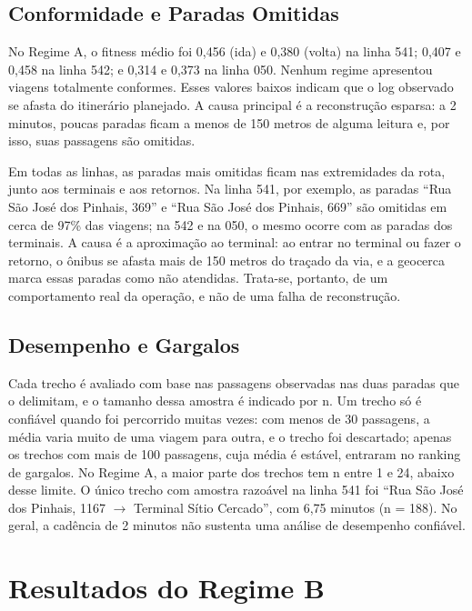 \subsection{Conformidade e Paradas Omitidas}\label{subsec:regimeA_conformidade}

No Regime A, o fitness médio foi 0,456 (ida) e 0,380 (volta) na linha 541; 0,407 e 0,458 na linha 542; e 0,314 e 0,373 na linha 050. Nenhum regime apresentou viagens totalmente conformes. Esses valores baixos indicam que o log observado se afasta do itinerário planejado. A causa principal é a reconstrução esparsa: a 2 minutos, poucas paradas ficam a menos de 150 metros de alguma leitura e, por isso, suas passagens são omitidas.

Em todas as linhas, as paradas mais omitidas ficam nas extremidades da rota, junto aos terminais e aos retornos. Na linha 541, por exemplo, as paradas ``Rua São José dos Pinhais, 369'' e ``Rua São José dos Pinhais, 669'' são omitidas em cerca de 97\% das viagens; na 542 e na 050, o mesmo ocorre com as paradas dos terminais. A causa é a aproximação ao terminal: ao entrar no terminal ou fazer o retorno, o ônibus se afasta mais de 150 metros do traçado da via, e a geocerca marca essas paradas como não atendidas. Trata-se, portanto, de um comportamento real da operação, e não de uma falha de reconstrução.

\subsection{Desempenho e Gargalos}\label{subsec:regimeA_desempenho}

Cada trecho é avaliado com base nas passagens observadas nas duas paradas que o delimitam, e o tamanho dessa amostra é indicado por n. Um trecho só é confiável quando foi percorrido muitas vezes: com menos de 30 passagens, a média varia muito de uma viagem para outra, e o trecho foi descartado; apenas os trechos com mais de 100 passagens, cuja média é estável, entraram no ranking de gargalos. No Regime A, a maior parte dos trechos tem n entre 1 e 24, abaixo desse limite. O único trecho com amostra razoável na linha 541 foi ``Rua São José dos Pinhais, 1167 $\rightarrow$ Terminal Sítio Cercado'', com 6,75 minutos (n = 188). No geral, a cadência de 2 minutos não sustenta uma análise de desempenho confiável.

\section{Resultados do Regime B}\label{sec:regimeB}

